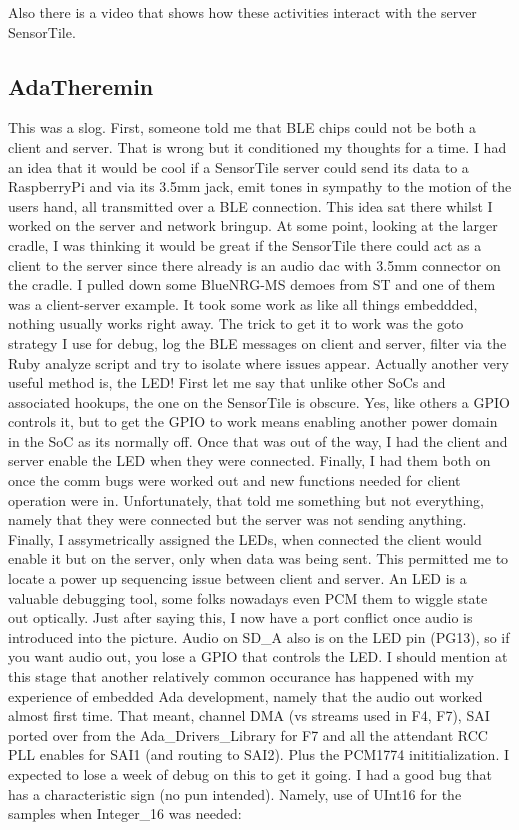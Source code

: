 \documentclass[11pt]{article}
\numberwithin{figure}{section}
\begin{document}
Also there is a video that shows how these activities interact with the
server SensorTile.

\subsection{AdaTheremin}
This was a slog. First, someone told me that BLE chips could not be
both a client and server. That is wrong but it conditioned my thoughts
for a time. I had an idea that it would be cool if a SensorTile server
could send its data to a RaspberryPi and via its 3.5mm jack, emit
tones in sympathy to the motion of the users hand, all transmitted
over a BLE connection. This idea sat there whilst I worked on the
server and network bringup. At some point, looking at the larger
cradle, I was thinking it would be great if the SensorTile there could
act as a client to the server since there already is an audio dac with
3.5mm connector on the cradle. I pulled down some BlueNRG-MS demoes
from ST and one of them was a client-server example. It took some work
as like all things embeddded, nothing usually works right away. The
trick to get it to work was the goto strategy I use for debug, log the
BLE messages on client and server, filter via the Ruby analyze script
and try to isolate where issues appear. Actually another very useful
method is, the LED! First let me say that unlike other SoCs and
associated hookups, the one on the SensorTile is obscure. Yes, like
others a GPIO controls it, but to get the GPIO to work means enabling
another power domain in the SoC as its normally off. Once that was out
of the way, I had the client and server enable the LED when they were
connected. Finally, I had them both on once the comm bugs were worked
out and new functions needed for client operation were
in. Unfortunately, that told me something but not everything, namely
that they were connected but the server was not sending
anything. Finally, I assymetrically assigned the LEDs, when connected
the client would enable it but on the server, only when data was being
sent. This permitted me to locate a power up sequencing issue between
client and server. An LED is a valuable debugging tool, some folks
nowadays even PCM them to wiggle state out optically. Just after
saying this, I now have a port conflict once audio is introduced into
the picture. Audio on SD\_A also is on the LED pin (PG13), so if you
want audio out, you lose a GPIO that controls the LED. I should
mention at this stage that another relatively common occurance has
happened with my experience of embedded Ada development, namely that
the audio out worked almost first time. That meant, channel DMA (vs
streams used in F4, F7), SAI ported over from the
Ada\_Drivers\_Library for F7 and all the attendant RCC PLL enables for
SAI1 (and routing to SAI2). Plus the PCM1774 inititialization. I
expected to lose a week of debug on this to get it going. I had a good
bug that has a characteristic sign (no pun intended). Namely, use of
UInt16 for the samples when Integer\_16 was needed:
\end{document}

